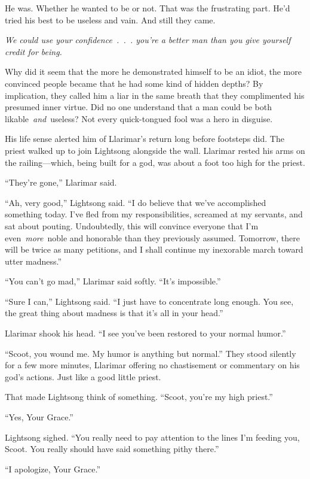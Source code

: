 He was. Whether he wanted to be or not. That was the frustrating part. He’d tried his best to be useless and vain. And still they came.

\textit{We could use your confidence~.~.~. you’re a better man than you give yourself credit for being.}

Why did it seem that the more he demonstrated himself to be an idiot, the more convinced people became that he had some kind of hidden depths? By implication, they called him a liar in the same breath that they complimented his presumed inner virtue. Did no one understand that a man could be both likable~\textit{and}~useless? Not every quick-tongued fool was a hero in disguise.

His life sense alerted him of Llarimar’s return long before footsteps did. The priest walked up to join Lightsong alongside the wall. Llarimar rested his arms on the railing—which, being built for a god, was about a foot too high for the priest.

“They’re gone,” Llarimar said.

“Ah, very good,” Lightsong said. “I do believe that we’ve accomplished something today. I’ve fled from my responsibilities, screamed at my servants, and sat about pouting. Undoubtedly, this will convince everyone that I’m even~\textit{more}~noble and honorable than they previously assumed. Tomorrow, there will be twice as many petitions, and I shall continue my inexorable march toward utter madness.”

“You can’t go mad,” Llarimar said softly. “It’s impossible.”

“Sure I can,” Lightsong said. “I just have to concentrate long enough. You see, the great thing about madness is that it’s all in your head.”

Llarimar shook his head. “I see you’ve been restored to your normal humor.”

“Scoot, you wound me. My humor is anything but normal.” They stood silently for a few more minutes, Llarimar offering no chastisement or commentary on his god’s actions. Just like a good little priest.

That made Lightsong think of something. “Scoot, you’re my high priest.”

“Yes, Your Grace.”

Lightsong sighed. “You really need to pay attention to the lines I’m feeding you, Scoot. You really should have said something pithy there.”

“I apologize, Your Grace.”

